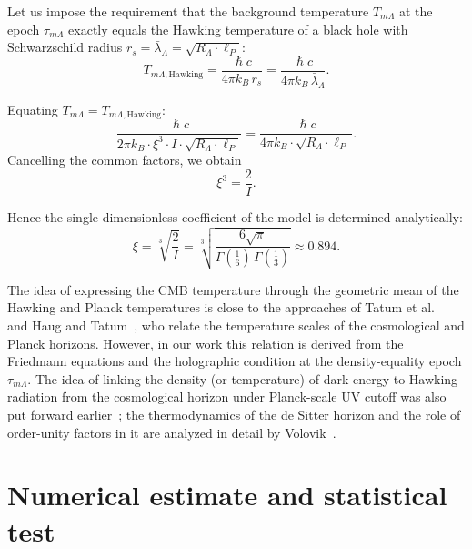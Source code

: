 \documentclass[10pt,a4paper]{article}
\DeclareRobustCommand{\hbar}{\hslash}
\begin{document}
Let us impose the requirement that the background temperature $T_{m\Lambda}$ at the epoch $\tau_{m\Lambda}$ exactly equals the Hawking temperature of a black hole with Schwarzschild radius $r_s = \bar\lambda_\Lambda = \sqrt{R_\Lambda \cdot \ell_P}$:
\begin{equation}
T_{m\Lambda\mathrm{, Hawking}} = \frac{\hbar c}{4\pi k_B\,r_s} = \frac{\hbar c}{4\pi k_B\,\bar\lambda_\Lambda}.
\end{equation}

Equating $T_{m\Lambda} = T_{m\Lambda\mathrm{, Hawking}}$:
\begin{equation}
\frac{\hbar c}{2\pi k_B \cdot \xi^3 \cdot I \cdot \sqrt{R_\Lambda \cdot \ell_P}} = \frac{\hbar c}{4\pi k_B \cdot \sqrt{R_\Lambda \cdot \ell_P}}.
\end{equation}
Cancelling the common factors, we obtain
\begin{equation}
\xi^3 = \frac{2}{I}.
\end{equation}

Hence the single dimensionless coefficient of the model is determined analytically:
\begin{equation}
\boxed{\xi = \sqrt[3]{\frac{2}{I}} = \sqrt[3]{\frac{6\sqrt{\pi}}{\Gamma(\tfrac{1}{6})\,\Gamma(\tfrac{1}{3})}} \approx 0.894.}
\end{equation}

The idea of expressing the CMB temperature through the geometric mean of the Hawking and Planck temperatures is close to the approaches of Tatum et al.~\cite{Tatum2015} and Haug and Tatum~\cite{Haug2024}, who relate the temperature scales of the cosmological and Planck horizons. However, in our work this relation is derived from the Friedmann equations and the holographic condition at the density-equality epoch $\tau_{m\Lambda}$. The idea of linking the density (or temperature) of dark energy to Hawking radiation from the cosmological horizon under Planck-scale UV cutoff was also put forward earlier~\cite{LeeLeeKim2010}; the thermodynamics of the de Sitter horizon and the role of order-unity factors in it are analyzed in detail by Volovik~\cite{Volovik2022}.

\section{Numerical estimate and statistical test}
\label{sec:empirical}
\end{document}
